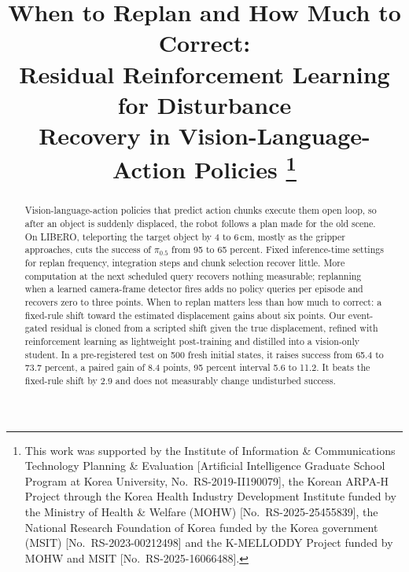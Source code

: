 \documentclass[conference,a4paper]{IEEEtran}
\begin{document}
\title{When to Replan and How Much to Correct:\\
Residual Reinforcement Learning for Disturbance\\
Recovery in Vision-Language-Action Policies
\thanks{This work was supported by the Institute of Information \&
Communications Technology Planning \& Evaluation [Artificial Intelligence
Graduate School Program at Korea University, No.~\mbox{RS-2019-II190079}], the
Korean \mbox{ARPA-H} Project through the Korea Health Industry Development
Institute funded by the Ministry of Health \& Welfare (MOHW)
[No.~\mbox{RS-2025-25455839}], the National Research Foundation of Korea
funded by the Korea government (MSIT) [No.~\mbox{RS-2023-00212498}] and the
\mbox{K-MELLODDY} Project funded by MOHW and MSIT [No.~\mbox{RS-2025-16066488}].}
}

\author{
\and
{}
}

\maketitle

\begin{abstract}
Vision-language-action policies that predict action chunks execute them open loop, so after an object is suddenly displaced, the robot follows a plan made for the old scene. On LIBERO, teleporting the target object by 4 to 6\,cm, mostly as the gripper approaches, cuts the success of {\boldmath$\pi_{0.5}$} from 95 to 65 percent. Fixed inference-time settings for replan frequency, integration steps and chunk selection recover little. More computation at the next scheduled query recovers nothing measurable; replanning when a learned camera-frame detector fires adds no policy queries per episode and recovers zero to three points. When to replan matters less than how much to correct: a fixed-rule shift toward the estimated displacement gains about six points. Our event-gated residual is cloned from a scripted shift given the true displacement, refined with reinforcement learning as lightweight post-training and distilled into a vision-only student. In a pre-registered test on 500 fresh initial states, it raises success from 65.4 to 73.7 percent, a paired gain of 8.4 points, 95 percent interval 5.6 to 11.2. It beats the fixed-rule shift by 2.9 and does not measurably change undisturbed success.
\end{abstract}
\end{document}

